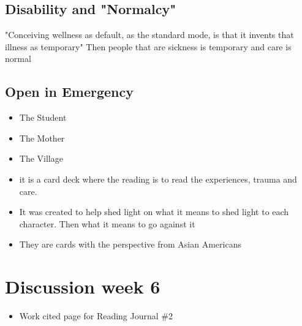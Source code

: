 \documentclass{article}
\begin{document}
\subsection{Disability and "Normalcy"}
"Conceiving wellness as default, as the standard mode, is that
it invents that illness as temporary"
Then people that are sickness is temporary and care is normal


\subsection{Open in Emergency}
\begin{itemize}
  \item The Student
  \item The Mother
  \item The Village
  \item it is a card deck where the reading is to read the experiences, trauma
    and care.
  \item It was created to help shed light on what it means to 
    shed light to each character.
    Then what it means to go against it
  \item They are cards with the perspective from Asian Americans
\end{itemize}

\section*{Discussion week 6}

\begin{itemize}
  \item Work cited page for Reading Journal \#2
\end{itemize}


  
\end{document}
